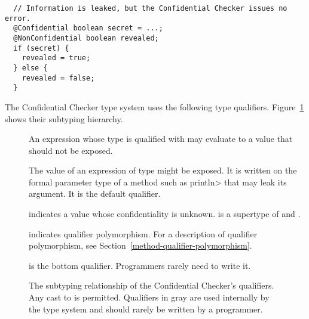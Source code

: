 \begin{Verbatim}
  // Information is leaked, but the Confidential Checker issues no error.
  @Confidential boolean secret = ...;
  @NonConfidential boolean revealed;
  if (secret) {
    revealed = true;
  } else {
    revealed = false;
  }
\end{Verbatim}



The Confidential Checker type system uses the following type qualifiers.
Figure~\ref{fig-confidential-hierarchy} shows their subtyping hierarchy.

\begin{description}
\item[]
    An expression whose type is qualified with
     may evaluate to
    a value that should not be exposed.
\item[]
    The value of an expression of type
     might be
    exposed.  It is written on the formal parameter type of a method such
    as \<println> that may leak its argument.  It is the default qualifier.
\item[]
    indicates a value whose confidentiality is unknown.
     is a supertype of 
    and .
\item[]
    indicates qualifier polymorphism. For a description of qualifier polymorphism,
    see Section~\ref{method-qualifier-polymorphism}.
\item[]
    is the bottom qualifier. Programmers rarely need to write it.
\end{description}


\begin{figure}
\caption{The subtyping relationship of the Confidential Checker's qualifiers.
  Any cast to  is permitted.
  Qualifiers in gray are used internally by the type system and should rarely
  be written by a programmer.
}
\label{fig-confidential-hierarchy}
\end{figure}

